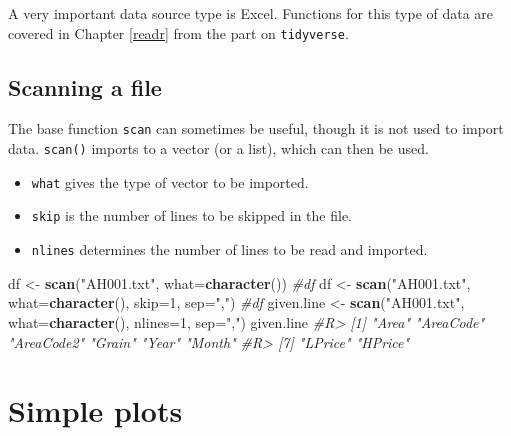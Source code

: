 \documentclass[]{book}
\newenvironment{Shaded}{}{}
\newcommand{\CommentTok}[1]{\textcolor[rgb]{0.38,0.63,0.69}{\textit{#1}}}
\newcommand{\DataTypeTok}[1]{\textcolor[rgb]{0.56,0.13,0.00}{#1}}
\newcommand{\DecValTok}[1]{\textcolor[rgb]{0.25,0.63,0.44}{#1}}
\newcommand{\KeywordTok}[1]{\textcolor[rgb]{0.00,0.44,0.13}{\textbf{#1}}}
\newcommand{\NormalTok}[1]{#1}
\newcommand{\StringTok}[1]{\textcolor[rgb]{0.25,0.44,0.63}{#1}}
\providecommand{\tightlist}{%
  \setlength{\itemsep}{0pt}\setlength{\parskip}{0pt}}
\theoremstyle{definition}
\theoremstyle{definition}
\theoremstyle{definition}
\theoremstyle{remark}
\begin{document}
A very important data source type is Excel. Functions for this type of
data are covered in Chapter \ref{readr} from the part on
\texttt{tidyverse}.

\hypertarget{scanning-a-file}{%
\section{Scanning a file}\label{scanning-a-file}}

The base function \texttt{scan} can sometimes be useful, though it is
not used to import data. \texttt{scan()} imports to a vector (or a
list), which can then be used.

\begin{itemize}
\tightlist
\item
  \texttt{what} gives the type of vector to be imported.\\
\item
  \texttt{skip} is the number of lines to be skipped in the file.\\
\item
  \texttt{nlines} determines the number of lines to be read and
  imported.
\end{itemize}

\begin{Shaded}
\begin{Highlighting}[]
\NormalTok{df <-}\StringTok{ }\KeywordTok{scan}\NormalTok{(}\StringTok{"AH001.txt"}\NormalTok{, }\DataTypeTok{what=}\KeywordTok{character}\NormalTok{())}
\CommentTok{#df}
\NormalTok{df <-}\StringTok{ }\KeywordTok{scan}\NormalTok{(}\StringTok{"AH001.txt"}\NormalTok{, }\DataTypeTok{what=}\KeywordTok{character}\NormalTok{(), }\DataTypeTok{skip=}\DecValTok{1}\NormalTok{, }\DataTypeTok{sep=}\StringTok{","}\NormalTok{)}
\CommentTok{#df}
\NormalTok{given.line <-}\StringTok{ }\KeywordTok{scan}\NormalTok{(}\StringTok{"AH001.txt"}\NormalTok{, }\DataTypeTok{what=}\KeywordTok{character}\NormalTok{(), }\DataTypeTok{nlines=}\DecValTok{1}\NormalTok{, }\DataTypeTok{sep=}\StringTok{","}\NormalTok{)}
\NormalTok{given.line}
\CommentTok{#R> [1] "Area"      "AreaCode"  "AreaCode2" "Grain"     "Year"      "Month"    }
\CommentTok{#R> [7] "LPrice"    "HPrice"}
\end{Highlighting}
\end{Shaded}

\hypertarget{splots}{%
\chapter{Simple plots}\label{splots}}
\end{document}
